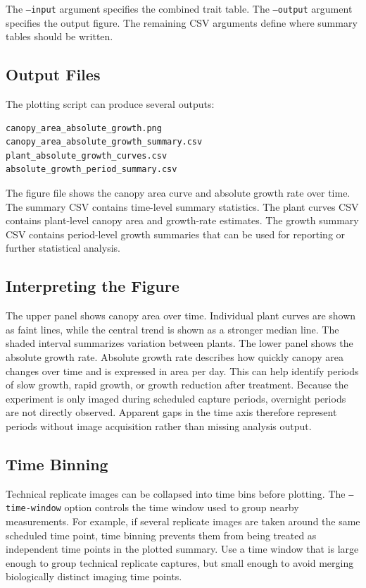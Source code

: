 The \texttt{--input} argument specifies the combined trait table. The
\texttt{--output} argument specifies the output figure. The remaining CSV
arguments define where summary tables should be written.

\subsection{Output Files}


The plotting script can produce several outputs:

\begin{verbatim}
canopy_area_absolute_growth.png
canopy_area_absolute_growth_summary.csv
plant_absolute_growth_curves.csv
absolute_growth_period_summary.csv
\end{verbatim}

The figure file shows the canopy area curve and absolute growth rate over time.
The summary CSV contains time-level summary statistics. The plant curves CSV
contains plant-level canopy area and growth-rate estimates. The growth summary
CSV contains period-level growth summaries that can be used for reporting or
further statistical analysis.

\subsection{Interpreting the Figure}

The upper panel shows canopy area over time. Individual plant curves are shown
as faint lines, while the central trend is shown as a stronger median line. The
shaded interval summarizes variation between plants. The lower panel shows the
absolute growth rate. Absolute growth rate describes how quickly canopy area
changes over time and is expressed in area per day. This can help identify
periods of slow growth, rapid growth, or growth reduction after treatment.
Because the experiment is only imaged during scheduled capture periods,
overnight periods are not directly observed. Apparent gaps in the time axis
therefore represent periods without image acquisition rather than missing
analysis output.

\subsection{Time Binning}

Technical replicate images can be collapsed into time bins before plotting. The
\texttt{--time-window} option controls the time window used to group nearby
measurements. For example, if several replicate images are taken around the
same scheduled time point, time binning prevents them from being treated as
independent time points in the plotted summary. Use a time window that is large
enough to group technical replicate captures, but small enough to avoid merging
biologically distinct imaging time points.

